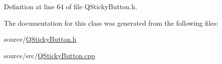Definition at line 64 of file Q\-Sticky\-Button.\-h.



The documentation for this class was generated from the following files\-:\begin{DoxyCompactItemize}
\item 
source/\hyperlink{_q_sticky_button_8h}{Q\-Sticky\-Button.\-h}\item 
source/src/\hyperlink{_q_sticky_button_8cpp}{Q\-Sticky\-Button.\-cpp}\end{DoxyCompactItemize}
